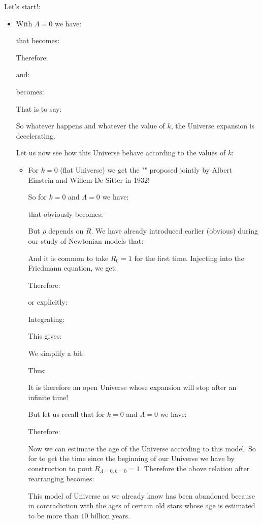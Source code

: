 	Let's start!:
	\begin{itemize}
		\item With $\Lambda=0$ we have:
			
			that becomes:
			
			Therefore:
			
			and:
			
			becomes:
			
			That is to say:
			
			So whatever happens and whatever the value of $k$, the Universe expansion is decelerating.
			
			Let us now see how this Universe behave according to the values of $k$:
			\begin{itemize}
				\item For $k=0$ (flat Universe) we get the "" proposed jointly by Albert Einstein and Willem De Sitter in 1932!
				
				So for $k=0$ and $\Lambda=0$ we have:
				
				that obviously becomes:
				
				But $\rho$ depends on $R$. We have already introduced earlier (obvious) during our study of Newtonian models that:
				
				And it is common to take $R_0=1$ for the first time. Injecting into the Friedmann equation, we get:
				
				Therefore:
				
				or explicitly:
				
				Integrating:
				
				This gives:
				
				We simplify a bit:
				
				Thus:
				
				It is therefore an open Universe whose expansion will stop after an infinite time!
				
				But let us recall that for $k=0$ and $\Lambda=0$ we have:
				
				Therefore:
								
				Now we can estimate the age of the Universe according to this model. So for to get the time since the beginning of our Universe we have by construction to pout $R_{\Lambda=0,k=0}=1$. Therefore the above relation after rearranging becomes:
				
				This model of Universe as we already know has been abandoned because in contradiction with the ages of certain old stars whose age is estimated to be more than $10$ billion years.


\end{itemize}
\end{itemize}
